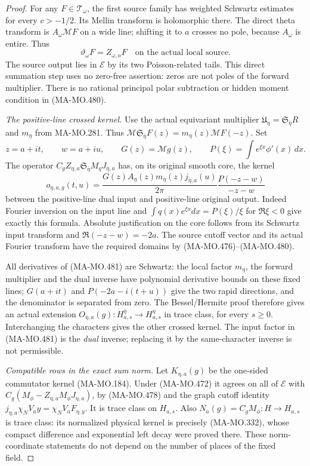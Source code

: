 \begin{proof}
For any \(F\in\mathcal T_\omega\), the first source
family has weighted Schwartz estimates for every
\(c>-1/2\). Its Mellin transform is holomorphic there.
The direct theta transform is \(A_\omega\mathcal MF\)
on a wide line; shifting it to \(a\) crosses no pole,
because \(A_\omega\) is entire. Thus
\[
                  \vartheta_\omega F=Z_{\omega,a}F
                     \quad\text{on the actual local source}.
 \tag{MA-MO.480}
\]
The source output lies in \(\mathcal E\) by its two
Poisson-related tails. This direct summation step uses
no zero-free assertion: zeros are not poles of the forward
multiplier. There is no rational principal polar subtraction
or hidden moment condition in (MA-MO.480).

\emph{The positive-line crossed kernel.}
Use the actual equivariant multiplier
\(\mathfrak U_\eta=\mathfrak S_{\bar\eta}R\) and
\(m_\eta\) from MA-MO.281. Thus
\(\mathcal M\mathfrak S_{\bar\eta}F(z)
       =m_\eta(z)\mathcal MF(-z)\).
Set
\[
       z=a+it,\qquad w=a+iu,\qquad
       G(z)=\mathcal Mg(z),\qquad
       P(\xi)=\int e^{\xi x}\phi'(x)\,dx.
\]
The operator
\(C_g Z_{\eta,a}\mathfrak S_{\bar\eta}M_qJ_{\bar\eta,a}\)
has, on its original smooth core, the kernel
\[
       o_{\eta,a,g}(t,u)
          =\frac{G(z)A_\eta(z)m_\eta(z)j_{\bar\eta,a}(u)}{2\pi}
                           \frac{P(-z-w)}{-z-w}
 \tag{MA-MO.481}
\]
between the positive-line dual input and positive-line
original output. Indeed Fourier inversion on the input
line and \(\int q(x)e^{\xi x}dx=P(\xi)/\xi\) for
\(\Re\xi<0\) give exactly this formula. Absolute
justification on the core follows from its Schwartz
input transform and \(\Re(-z-w)=-2a\). The source
cutoff vector and its actual Fourier transform have the
required domains by (MA-MO.476)--(MA-MO.480).

All derivatives of (MA-MO.481) are Schwartz: the local
factor \(m_\eta\), the forward multiplier and the
dual inverse have polynomial derivative bounds on these
fixed lines; \(G(a+it)\) and \(P(-2a-i(t+u))\) give
the two rapid directions, and the denominator is separated
from zero. The Bessel/Hermite proof therefore gives an
actual extension
\(O_{\eta,a}(g):H_{a,s}^{\bar\eta}\to H_{a,s}^\eta\)
in trace class, for every \(s\ge0\). Interchanging the
characters gives the other crossed kernel. The input
factor in (MA-MO.481) is the \emph{dual} inverse; replacing
it by the same-character inverse is not permissible.

\emph{Compatible rows in the exact sum norm.}
Let \(K_{\eta,a}(g)\) be the one-sided commutator kernel
(MA-MO.184). Under (MA-MO.472) it agrees on all of
\(\mathcal E\) with
\(C_g(M_\phi-Z_{\eta,a}M_\phi J_{\eta,a})\), by
(MA-MO.478) and the graph cutoff identity
\(j_{\eta,a}\chi_NV_ay=\chi_NV_aF_{\eta,y}\).
It is trace class on \(H_{a,s}\). Also
\(N_a(g)=C_gM_\phi:H\to H_{a,s}\) is trace class:
its normalized physical kernel is precisely (MA-MO.332),
whose compact difference and exponential left decay
were proved there. These norm-coordinate statements do
not depend on the number of places of the fixed field.


\end{proof}
